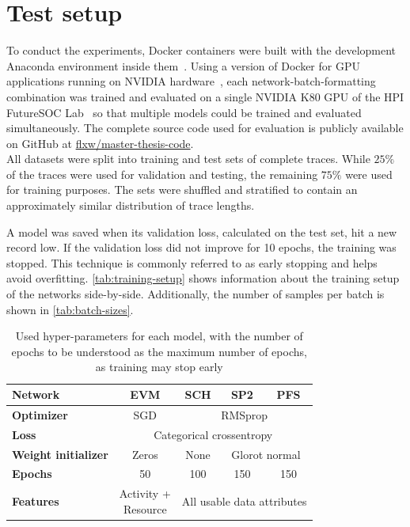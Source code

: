 \section{Test setup}
\label{sec:eval:test-setup}
To conduct the experiments, Docker containers were built with the development Anaconda environment inside them~\cite{web:docker}. Using a version of Docker for GPU applications running on NVIDIA hardware~\cite{web:nvidia-docker}, each network-batch-formatting combination was trained and evaluated on a single NVIDIA K80 GPU of the HPI FutureSOC Lab~\cite{web:fsoc} so that multiple models could be trained and evaluated simultaneously. The complete source code used for evaluation is publicly available on GitHub at \href{https://github.com/flxw/master-thesis-code}{flxw/master-thesis-code}.\\

All datasets were split into training and test sets of complete traces. While $25\%$ of the traces were used for validation and testing, the remaining $75\%$ were used for training purposes. The sets were shuffled and stratified to contain an approximately similar distribution of trace lengths.

A model was saved when its validation loss, calculated on the test set, hit a new record low. If the validation loss did not improve for 10 epochs, the training was stopped. This technique is commonly referred to as early stopping and helps avoid overfitting. \autoref{tab:training-setup} shows information about the training setup of the networks side-by-side. Additionally, the number of samples per batch is shown in \autoref{tab:batch-sizes}.

\begin{table}[ht!]
    \centering
    \begin{tabular}{lcccc}
        \textbf{Network}   & \textbf{EVM} & \textbf{SCH} & \textbf{SP2} & \textbf{PFS}\\
        \hline
        \textbf{Optimizer} & SGD & \multicolumn{3}{c}{RMSprop} \\
        \textbf{Loss}      &\multicolumn{4}{c}{Categorical crossentropy}\\
        \textbf{Weight initializer} & Zeros & None & \multicolumn{2}{c}{Glorot normal}\\
        \textbf{Epochs}    & 50 & 100 & 150 & 150\\
        \textbf{Features}  & \makecell{Activity +\\Resource} & \multicolumn{3}{c}{All usable data attributes}\\
    \end{tabular}
    \caption{Used hyper-parameters for each model, with the number of epochs to be understood as the maximum number of epochs, as training may stop early}
    \label{tab:training-setup}
\end{table}


